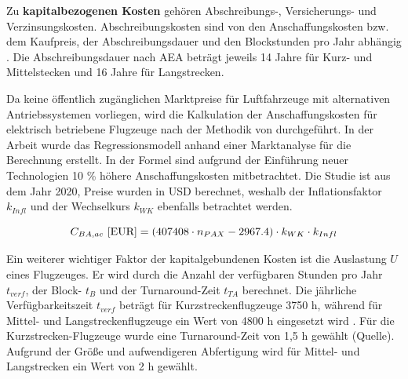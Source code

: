 
Zu \textbf{kapitalbezogenen Kosten} gehören Abschreibungs-, Versicherungs- und Verzinsungskosten. 
Abschreibungskosten sind von den Anschaffungskosten bzw. dem Kaufpreis, 
der Abschreibungsdauer und den Blockstunden pro Jahr abhängig \cite{conrady2019luftverkehr}.
Die Abschreibungsdauer nach AEA beträgt jeweils 14 Jahre für 
Kurz- und Mittelstecken und 16 Jahre für Langstrecken.

Da keine öffentlich zugänglichen Marktpreise für Luftfahrzeuge mit alternativen Antriebssystemen vorliegen, 
wird die Kalkulation der Anschaffungskosten für elektrisch betriebene Flugzeuge 
nach der Methodik von \cite{monjon2020conceptual} durchgeführt. 
In der Arbeit wurde das Regressionsmodell anhand einer Marktanalyse für die Berechnung erstellt. 
In der Formel sind aufgrund der Einführung neuer Technologien 10 \% höhere Anschaffungskosten mitbetrachtet. 
Die Studie ist aus dem Jahr 2020, Preise wurden in USD berechnet, 
weshalb der Inflationsfaktor $k_{Infl}$ und der Wechselkurs $k_{WK}$ 
ebenfalls betrachtet werden.

\begin{equation}
   {C_{BA,ac} ~[\text{EUR}]} = (407408 \cdot n_{PAX} - 2967.4) \cdot k_{WK} \cdot {k_{Infl}}\\
   \label{price BA}
\end{equation}

Ein weiterer wichtiger Faktor der kapitalgebundenen Kosten ist die Auslastung $U$ eines Flugzeuges. 
Er wird durch die Anzahl der verfügbaren Stunden pro Jahr $t_{verf}$, 
der Block- $t_B$ und der Turnaround-Zeit $t_{TA}$ berechnet. 
Die jährliche Verfügbarkeitszeit $t_{verf}$ beträgt für Kurzstreckenflugzeuge 3750 h, 
während für Mittel- und Langstreckenflugzeuge ein Wert von 4800 h eingesetzt wird \cite{scholz_design_evaluation_doc}. 
Für die Kurzstrecken-Flugzeuge wurde eine Turnaround-Zeit von 1,5 h gewählt (Quelle).
Aufgrund der Größe und aufwendigeren Abfertigung wird für Mittel- und Langstrecken ein Wert von 2 h gewählt.

